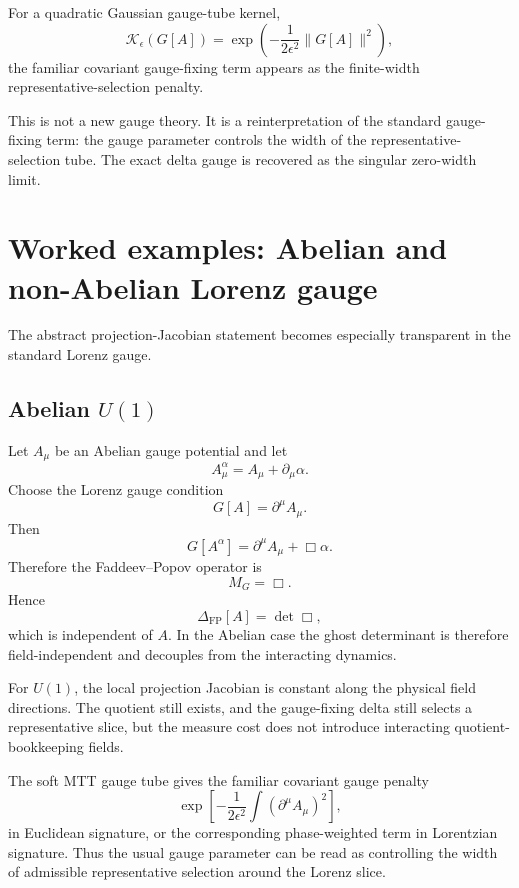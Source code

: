 \documentclass[11pt]{article}
\newcommand{\FP}{\mathrm{FP}}
\begin{document}
For a quadratic Gaussian gauge-tube kernel,
\[
\mathcal K_\epsilon(G[A])
=
\exp\left(-\frac{1}{2\epsilon^2}\|G[A]\|^2\right),
\]
the familiar covariant gauge-fixing term appears as the finite-width representative-selection penalty.

\begin{remark}
This is not a new gauge theory. It is a reinterpretation of the standard gauge-fixing term: the gauge parameter controls the width of the representative-selection tube. The exact delta gauge is recovered as the singular zero-width limit.
\end{remark}

\section{Worked examples: Abelian and non-Abelian Lorenz gauge}

The abstract projection-Jacobian statement becomes especially transparent in the standard Lorenz gauge.

\subsection{Abelian \(U(1)\)}

Let \(A_\mu\) be an Abelian gauge potential and let
\[
A_\mu^\alpha=A_\mu+\partial_\mu\alpha .
\]
Choose the Lorenz gauge condition
\[
G[A]=\partial^\mu A_\mu .
\]
Then
\[
G[A^\alpha]
=
\partial^\mu A_\mu+\Box\alpha .
\]
Therefore the Faddeev--Popov operator is
\[
M_G=\Box .
\]
Hence
\[
\Delta_{\FP}[A]=\det \Box ,
\]
which is independent of \(A\). In the Abelian case the ghost determinant is therefore field-independent and decouples from the interacting dynamics.

\begin{remark}
For \(U(1)\), the local projection Jacobian is constant along the physical field directions. The quotient still exists, and the gauge-fixing delta still selects a representative slice, but the measure cost does not introduce interacting quotient-bookkeeping fields.
\end{remark}

The soft MTT gauge tube gives the familiar covariant gauge penalty
\[
\exp\left[-\frac{1}{2\epsilon^2}\int(\partial^\mu A_\mu)^2\right],
\]
in Euclidean signature, or the corresponding phase-weighted term in Lorentzian signature. Thus the usual gauge parameter can be read as controlling the width of admissible representative selection around the Lorenz slice.
\end{document}

